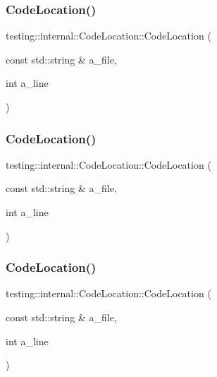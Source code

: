 \subsubsection{\texorpdfstring{CodeLocation()}{CodeLocation()}\hspace{0.1cm}{\footnotesize\ttfamily [1/3]}}
{\footnotesize\ttfamily testing\+::internal\+::\+Code\+Location\+::\+Code\+Location (\begin{DoxyParamCaption}\item[{const std\+::string \&}]{a\+\_\+file,  }\item[{int}]{a\+\_\+line }\end{DoxyParamCaption})\hspace{0.3cm}{\ttfamily [inline]}}

\mbox{\label{structtesting_1_1internal_1_1_code_location_a323a11851c81629d632c47b9b767b8ac}} 
\subsubsection{\texorpdfstring{CodeLocation()}{CodeLocation()}\hspace{0.1cm}{\footnotesize\ttfamily [2/3]}}
{\footnotesize\ttfamily testing\+::internal\+::\+Code\+Location\+::\+Code\+Location (\begin{DoxyParamCaption}\item[{const std\+::string \&}]{a\+\_\+file,  }\item[{int}]{a\+\_\+line }\end{DoxyParamCaption})\hspace{0.3cm}{\ttfamily [inline]}}

\mbox{\label{structtesting_1_1internal_1_1_code_location_a323a11851c81629d632c47b9b767b8ac}} 
\subsubsection{\texorpdfstring{CodeLocation()}{CodeLocation()}\hspace{0.1cm}{\footnotesize\ttfamily [3/3]}}
{\footnotesize\ttfamily testing\+::internal\+::\+Code\+Location\+::\+Code\+Location (\begin{DoxyParamCaption}\item[{const std\+::string \&}]{a\+\_\+file,  }\item[{int}]{a\+\_\+line }\end{DoxyParamCaption})\hspace{0.3cm}{\ttfamily [inline]}}



